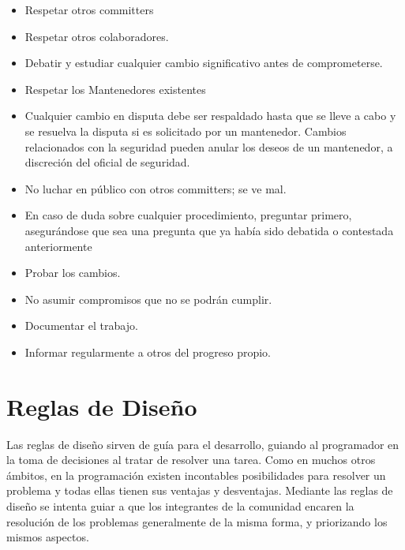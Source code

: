 \begin{itemize}
\item Respetar otros committers
\item Respetar otros colaboradores.
\item Debatir y estudiar cualquier cambio significativo antes de comprometerse.
\item Respetar los Mantenedores existentes
\item Cualquier cambio en disputa debe ser respaldado hasta que se lleve a cabo y se resuelva la disputa si es solicitado por un mantenedor. Cambios relacionados con la seguridad pueden anular los deseos de un mantenedor, a discreción del oficial de seguridad.
\item No luchar en público con otros committers; se ve mal.
\item En caso de duda sobre cualquier procedimiento, preguntar primero, asegurándose que sea una pregunta que ya había sido debatida o contestada anteriormente
\item Probar los cambios.
\item No asumir compromisos que no se podrán cumplir.
\item Documentar el trabajo.
\item Informar regularmente a otros del progreso propio.
\end{itemize}

\section{Reglas de Diseño}
{Las reglas de diseño sirven de guía para el desarrollo, guiando al programador en la toma de decisiones al tratar de resolver una tarea. Como en muchos otros ámbitos, en la programación existen incontables posibilidades para resolver un problema y todas ellas tienen sus ventajas y desventajas. Mediante las reglas de diseño se intenta guiar a que los integrantes de la comunidad encaren la resolución de los problemas generalmente de la misma forma, y priorizando los mismos aspectos.}


